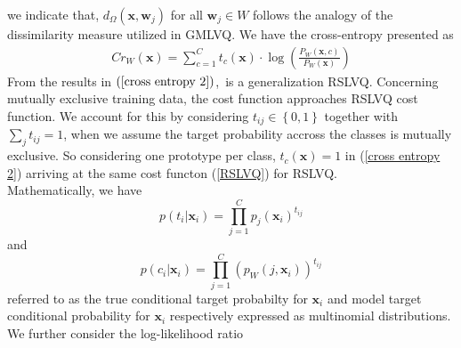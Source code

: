 \documentclass[english]{HSMW-Thesis}
\begin{document}
we indicate that,\hspace{2pt} $d_{\Omega}\left( \mathbf{x},\mathbf{w}_{j}\right)$\hspace{2pt} for all\hspace{2pt} $\mathbf{w}_{j}\in W$\hspace{2pt} follows the analogy of the dissimilarity measure utilized in GMLVQ.
We have the cross-entropy presented as
\begin{align}\label{cross entropy 2}
	Cr_{W}\left( \mathbf{x}\right) =\sum_{c=1}^{C}t_{c}\left( \mathbf{x}\right) \cdot\log\left( \frac{P_{W}\left( \mathbf{x},c\right) }{P_{W}\left( \mathbf{x}\right) } \right) 
\end{align}
From the results in $\left(\ref{cross entropy 2}\right) $,\ is a generalization RSLVQ\cite{villmann2018probabilistic}.
Concerning mutually exclusive training data, the cost function approaches RSLVQ cost function\cite{villmann2018probabilistic}. We account for this by considering\hspace{2pt} $t_{ij}\in\left\lbrace 0,1\right\rbrace  $\hspace{2pt} together with \hspace{2pt}$\sum_{j}t_{ij}=1$, \hspace{2pt}when we assume the target probability accross the classes is mutually exclusive. So considering one prototype per class,\hspace{2pt} $t_{c}\left( \mathbf{x}\right) = 1$\hspace{2pt} in (\ref{cross entropy 2}) arriving at the same cost functon (\ref{RSLVQ}) for RSLVQ.\\ Mathematically, we have
\begin{equation*}
	p\left( t_{i}| \mathbf{x}_{i} \right) = \prod_{j=1}^{C}p_{j}\left( \mathbf{x}_{i}\right) ^{t_{ij}}
\end{equation*}
and 
\begin{equation*}
	p\left( c_{i}| \mathbf{x}_{i} \right) = \prod_{j=1}^{C}\left( p_{W}\left( j,\mathbf{x}_{i}\right)\right) ^{t_{ij}}
\end{equation*}
referred to as the true conditional target probabilty for\hspace{2pt} $\mathbf{x}_{i}$\hspace{2pt} and model target conditional probability for \hspace{2pt}$\mathbf{x}_{i}$ \hspace{2pt}respectively expressed as multinomial distributions\cite{villmann2018probabilistic}. We further consider the log-likelihood ratio
\end{document}
